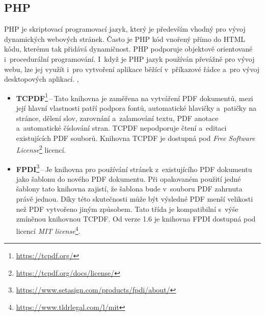 \subsection*{PHP}

PHP je skriptovací programovací jazyk, který je především vhodný pro vývoj
dynamických webových stránek. Často je PHP kód vnořený přímo do HTML kódu, kterému
tak přidává dynamičnost. PHP podporuje objektově orientované i~procedurální 
programování. I~když je PHP jazyk používán převážně pro vývoj webu, lze jej využít
i~pro vytvoření aplikace běžící v~příkazové řádce a~pro vývoj
desktopových aplikací.
\cite{PHP_is}, \cite{PHP_can_do}

\begin{itemize}
    \item \textbf{TCPDF}\footnote{
    \href{https://tcpdf.org/}{https://tcpdf.org/}
    }\,--\,Tato knihovna je zaměřena na vytváření PDF dokumentů, mezi její hlavní
    vlastnosti patří podpora fontů, automatické hlavičky a~patičky na stránce,
    dělení slov, zarovnání a~zalamování textu, PDF anotace a~automatické číslování
    stran. TCPDF nepodporuje čtení a~editaci existujících PDF souborů.
    Knihovna TCPDF je dostupná pod \emph{Free Software License}\footnote{
    \href{https://tcpdf.org/docs/license/}{https://tcpdf.org/docs/license/}
    } licencí.

    

    \item \textbf{FPDI}\footnote{
    \href{https://www.setasign.com/products/fpdi/about/}{https://www.setasign.com/products/fpdi/about/}
    }\,--\,Je knihovna pro používání stránek z~existujícího PDF dokumentu jako
    šablonu do nového PDF dokumentu. Při opakovaném použití jedné šablony tato 
    knihovna zajistí, že šablona bude v~souboru PDF zahrnuta právě jednou. Díky
    této skutečnosti může být výsledné PDF menší velikosti než PDF vytvořeno jiným
    způsobem. Tato třída je kompatibilní s~výše zmíněnou knihovnou TCPDF. Od verze
    1.6 je knihovna FPDI dostupná pod licencí \emph{MIT license}\footnote{
    \href{https://www.tldrlegal.com/l/mit}{https://www.tldrlegal.com/l/mit}
    }.

\end{itemize}


